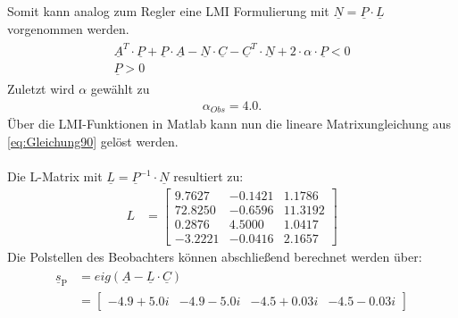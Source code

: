 \clearpage

Somit kann analog zum Regler eine LMI Formulierung mit $\underline{N}=\underline{P}\cdot\underline{L}$ vorgenommen werden. 
\begin{align} \label{eq:Gleichung90}
    \begin{split}
        \underline{A}^T\cdot\underline{P} + \underline{P}\cdot\underline{A} - \underline{N}\cdot\underline{C} - \underline{C}^T\cdot\underline{N} + 2\cdot\alpha\cdot\underline{P} < 0 \\
        \underline{P} > 0
    \end{split}
\end{align}
\newline
Zuletzt wird $\alpha$ gewählt zu
\begin{align*}
    \alpha _{Obs} = 4.0.
\end{align*}
\newline
Über die LMI-Funktionen in Matlab kann nun die lineare Matrixungleichung aus \autoref{eq:Gleichung90} gelöst werden.\\\\
Die L-Matrix mit $\underline{L} = \underline{P}^{-1}\cdot\underline{N}$ resultiert zu:
\begin{align}
    L &= 
    \begin{bmatrix}
        9.7627 & -0.1421 & 1.1786 \\
        72.8250 & -0.6596 & 11.3192 \\
        0.2876 & 4.5000 & 1.0417 \\
        -3.2221 & -0.0416 & 2.1657
    \end{bmatrix}
\end{align}
\newline
Die Polstellen des Beobachters können abschließend berechnet werden über:
\begin{align}
    \begin{split}
        \underline{s}_{\mathrm{P}} &= eig(\underline{A} - \underline{L}\cdot\underline{C}) \\&=
        \begin{bmatrix}
            -4.9 + 5.0i & -4.9 - 5.0i & -4.5 + 0.03i & -4.5 - 0.03i
        \end{bmatrix}
    \end{split}
\end{align}

